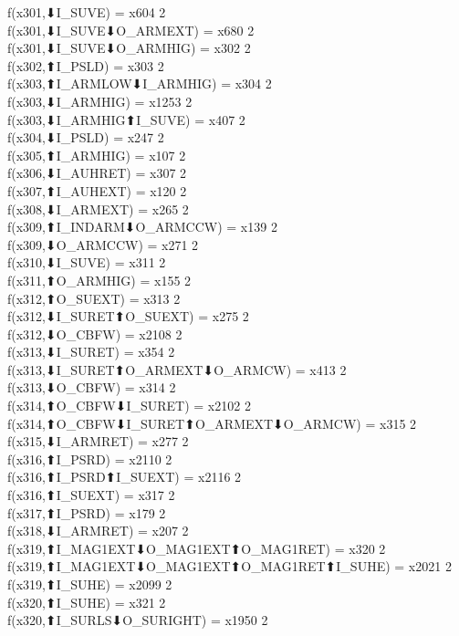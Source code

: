 f(x301,⬇I_SUVE) = x604 {2} \\
f(x301,⬇I_SUVE⬇O_ARMEXT) = x680 {2} \\
f(x301,⬇I_SUVE⬇O_ARMHIG) = x302 {2} \\
f(x302,⬆I_PSLD) = x303 {2} \\
f(x303,⬆I_ARMLOW⬇I_ARMHIG) = x304 {2} \\
f(x303,⬇I_ARMHIG) = x1253 {2} \\
f(x303,⬇I_ARMHIG⬆I_SUVE) = x407 {2} \\
f(x304,⬇I_PSLD) = x247 {2} \\
f(x305,⬆I_ARMHIG) = x107 {2} \\
f(x306,⬇I_AUHRET) = x307 {2} \\
f(x307,⬆I_AUHEXT) = x120 {2} \\
f(x308,⬇I_ARMEXT) = x265 {2} \\
f(x309,⬆I_INDARM⬇O_ARMCCW) = x139 {2} \\
f(x309,⬇O_ARMCCW) = x271 {2} \\
f(x310,⬇I_SUVE) = x311 {2} \\
f(x311,⬆O_ARMHIG) = x155 {2} \\
f(x312,⬆O_SUEXT) = x313 {2} \\
f(x312,⬇I_SURET⬆O_SUEXT) = x275 {2} \\
f(x312,⬇O_CBFW) = x2108 {2} \\
f(x313,⬇I_SURET) = x354 {2} \\
f(x313,⬇I_SURET⬆O_ARMEXT⬇O_ARMCW) = x413 {2} \\
f(x313,⬇O_CBFW) = x314 {2} \\
f(x314,⬆O_CBFW⬇I_SURET) = x2102 {2} \\
f(x314,⬆O_CBFW⬇I_SURET⬆O_ARMEXT⬇O_ARMCW) = x315 {2} \\
f(x315,⬇I_ARMRET) = x277 {2} \\
f(x316,⬆I_PSRD) = x2110 {2} \\
f(x316,⬆I_PSRD⬆I_SUEXT) = x2116 {2} \\
f(x316,⬆I_SUEXT) = x317 {2} \\
f(x317,⬆I_PSRD) = x179 {2} \\
f(x318,⬇I_ARMRET) = x207 {2} \\
f(x319,⬆I_MAG1EXT⬇O_MAG1EXT⬆O_MAG1RET) = x320 {2} \\
f(x319,⬆I_MAG1EXT⬇O_MAG1EXT⬆O_MAG1RET⬆I_SUHE) = x2021 {2} \\
f(x319,⬆I_SUHE) = x2099 {2} \\
f(x320,⬆I_SUHE) = x321 {2} \\
f(x320,⬆I_SURLS⬇O_SURIGHT) = x1950 {2} \\
